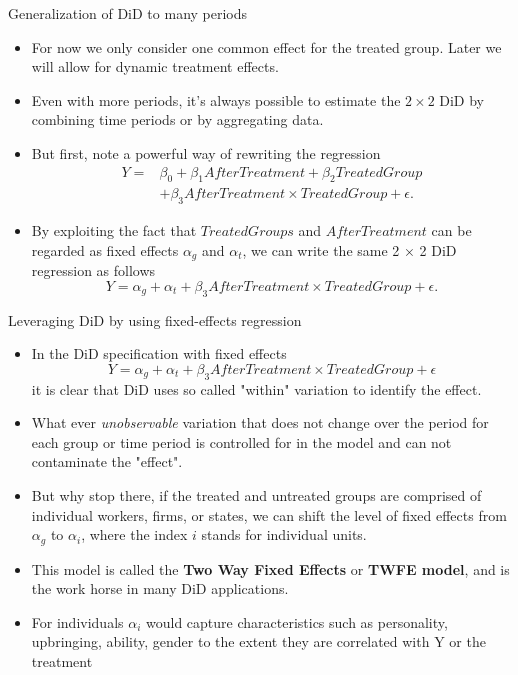 \documentclass[notes,11pt, aspectratio=169]{beamer}
\begin{document}
\begin{frame}{Generalization of DiD to many periods}
\begin{itemize}
\item For now we only consider one common effect for the treated group. Later we will allow for dynamic treatment effects.
\item Even with more periods, it's always possible to estimate the $2\times2$ DiD by combining time periods or by aggregating data. 
\item But first, note a powerful way of rewriting the regression
\begin{align}
Y = &\beta_0 + \beta_1 AfterTreatment + \beta_2 TreatedGroup\\ \nonumber
&+ \beta_3 AfterTreatment \times TreatedGroup + \epsilon.
\end{align}
\item By exploiting the fact that $TreatedGroups$ and $AfterTreatment$ can be regarded as fixed effects $\alpha_g$ and $\alpha_{t}$, we can write the same 2 × 2 DiD regression as follows 
\begin{equation}
Y = \alpha_g + \alpha_{t} + \beta_3 AfterTreatment \times TreatedGroup + \epsilon.
\end{equation}
\end{itemize}
\end{frame}

\begin{frame}{Leveraging DiD by using fixed-effects regression}
\begin{itemize}
\item In the DiD specification with fixed effects 
\begin{equation}
Y = \alpha_g + \alpha_{t} + \beta_3 AfterTreatment \times TreatedGroup + \epsilon
\end{equation}
it is clear that DiD uses so called "within" variation to identify the effect. 
\item What ever \emph{unobservable} variation that does not change over the period for each group or time period is controlled for in the model and can not contaminate the "effect".    
\item But why stop there, if the treated and untreated groups are comprised of individual workers, firms, or states, we can shift the level of fixed effects from $\alpha_g$ to $\alpha_i$, where the index $i$ stands for individual units.  
\item This model is called the \textbf{Two Way Fixed Effects} or \textbf{TWFE model}, and is the work horse in many DiD applications.
\item For individuals $\alpha_i$ would capture characteristics such as personality, upbringing, ability, gender to the extent they are correlated with Y or the treatment
\end{itemize}
\end{frame}
\end{document}
